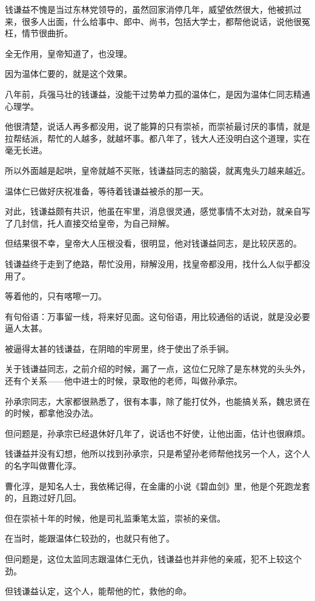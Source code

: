 \begin{multicols}{\theparacolNo}
		钱谦益不愧是当过东林党领导的，虽然回家消停几年，威望依然很大，他被抓过来，很多人出面，什么给事中、郎中、尚书，包括大学士，都帮他说话，说他很冤枉，情节很曲折。

		全无作用，皇帝知道了，也没理。

		因为温体仁要的，就是这个效果。

		八年前，兵强马壮的钱谦益，没能干过势单力孤的温体仁，是因为温体仁同志精通心理学。

		他很清楚，说话人再多都没用，说了能算的只有崇祯，而崇祯最讨厌的事情，就是拉帮结派，帮忙的人越多，就越坏事。都八年了，钱大人还没明白这个道理，实在毫无长进。

		所以外面越是起哄，皇帝就越不买账，钱谦益同志的脑袋，就离鬼头刀越来越近。

		温体仁已做好庆祝准备，等待着钱谦益被杀的那一天。

		对此，钱谦益颇有共识，他虽在牢里，消息很灵通，感觉事情不太对劲，就亲自写了几封信，托人直接交给皇帝，为自己辩解。

		但结果很不幸，皇帝大人压根没看，很明显，他对钱谦益同志，是比较厌恶的。

		钱谦益终于走到了绝路，帮忙没用，辩解没用，找皇帝都没用，找什么人似乎都没用了。

		等着他的，只有喀嚓一刀。

		有句俗语：万事留一线，将来好见面。这句俗语，用比较通俗的话说，就是没必要逼人太甚。

		被逼得太甚的钱谦益，在阴暗的牢房里，终于使出了杀手锏。

		关于钱谦益同志，之前介绍的时候，漏了一点，这位仁兄除了是东林党的头头外，还有个关系——他中进士的时候，录取他的老师，叫做孙承宗。

		孙承宗同志，大家都很熟悉了，很有本事，除了能打仗外，也能搞关系，魏忠贤在的时候，都拿他没办法。

		但问题是，孙承宗已经退休好几年了，说话也不好使，让他出面，估计也很麻烦。

		钱谦益并没有幻想，他所以找到孙承宗，只是希望孙老师帮他找另一个人，这个人的名字叫做曹化淳。

		曹化淳，是知名人士，我依稀记得，在金庸的小说《碧血剑》里，他是个死跑龙套的，且跑过好几回。

		但在崇祯十年的时候，他是司礼监秉笔太监，崇祯的亲信。

		在当时，能跟温体仁较劲的，也就只有他了。

		但问题是，这位太监同志跟温体仁无仇，钱谦益也并非他的亲戚，犯不上较这个劲。

		但钱谦益认定，这个人，能帮他的忙，救他的命。


\end{multicols}
